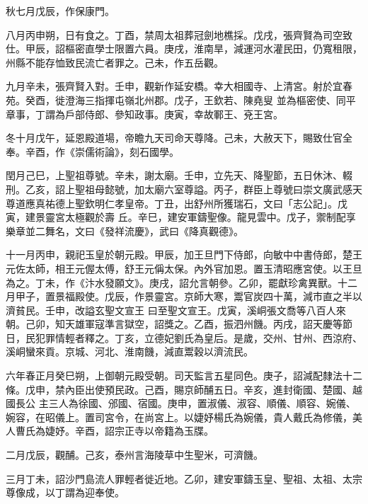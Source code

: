 \begin{pinyinscope}
 秋七月戊辰，作保康門。



 八月丙申朔，日有食之。丁酉，禁周太祖葬冠劍地樵採。戊戌，張齊賢為司空致仕。甲辰，詔樞密直學士限置六員。庚戌，淮南旱，減運河水灌民田，仍寬租限，州縣不能存恤致民流亡者罪之。己未，作五岳觀。



 九月辛未，張齊賢入對。壬申，觀新作延安橋。幸大相國寺、上清宮。射於宜春苑。癸酉，徙澄海三指揮屯嶺北州郡。戊子，王欽若、陳堯叟
 並為樞密使、同平章事，丁謂為戶部侍郎、參知政事。庚寅，幸故鄆王、兗王宮。



 冬十月戊午，延恩殿道場，帝瞻九天司命天尊降。己未，大赦天下，賜致仕官全奉。辛酉，作《崇儒術論》，刻石國學。



 閏月己巳，上聖祖尊號。辛未，謝太廟。壬申，立先天、降聖節，五日休沐、輟刑。乙亥，詔上聖祖母懿號，加太廟六室尊謚。丙子，群臣上尊號曰崇文廣武感天尊道應真祐德上聖欽明仁孝皇帝。丁丑，出舒州所獲瑞石，文曰「志公記」。戊寅，建景靈宮太極觀於壽
 丘。辛巳，建安軍鑄聖像。龍見雲中。戊子，禦制配享樂章並二舞名，文曰《發祥流慶》，武曰《降真觀德》。



 十一月丙申，親祀玉皇於朝元殿。甲辰，加王旦門下侍郎，向敏中中書侍郎，楚王元佐太師，相王元偓太傅，舒王元偁太保。內外官加恩。置玉清昭應宮使。以王旦為之。丁未，作《汴水發願文》。庚戌，詔允言朝參。乙卯，罷獻珍禽異獸。十二月甲子，置景福殿使。戊辰，作景靈宮。京師大寒，鬻官炭四十萬，減市直之半以濟貧民。壬申，改謚玄聖文宣王
 曰至聖文宣王。戊寅，溪峒張文喬等八百人來朝。己卯，知天雄軍寇準言獄空，詔獎之。乙酉，振泗州饑。丙戌，詔天慶等節日，民犯罪情輕者釋之。丁亥，立德妃劉氏為皇后。是歲，交州、甘州、西涼府、溪峒蠻來貢。京城、河北、淮南饑，減直鬻穀以濟流民。



 六年春正月癸巳朔，上御朝元殿受朝。司天監言五星同色。庚子，詔減配隸法十二條。戊申，禁內臣出使預民政。己酉，賜京師酺五日。辛亥，進封衛國、楚國、越國長公
 主三人為徐國、邠國、宿國。庚申，置淑儀、淑容、順儀、順容、婉儀、婉容，在昭儀上。置司宮令，在尚宮上。以婕妤楊氏為婉儀，貴人戴氏為修儀，美人曹氏為婕妤。辛酉，詔宗正寺以帝籍為玉牒。



 二月戊辰，觀酺。己亥，泰州言海陵草中生聖米，可濟饑。



 三月丁未，詔沙門島流人罪輕者徙近地。乙卯，建安軍鑄玉皇、聖祖、太祖、太宗尊像成，以丁謂為迎奉使。




\end{pinyinscope}
